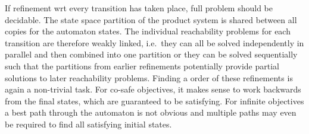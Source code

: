 \stopsubsection


\startsubsection[title={Transition Selection}]

    If refinement wrt every transition has taken place, full problem should be decidable.
    The state space partition of the product system is shared between all copies for the automaton states.
    The individual reachability problems for each transition are therefore weakly linked, i.e.\ they can all be solved independently in parallel and then combined into one partition or they can be solved sequentially such that the partitions from earlier refinements potentially provide partial solutions to later reachability problems.
    Finding a  order of these refinements is again a non-trivial task.
    For co-safe objectives, it makes sense to work backwards from the final states, which are guaranteed to be satisfying.
    For infinite objectives a best path through the automaton is not obvious and multiple paths may even be required to find all satisfying initial states.

\stopsubsection

